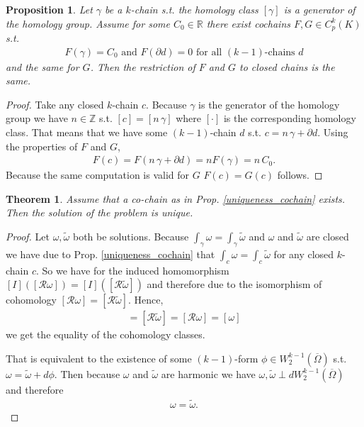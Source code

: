\documentclass[12pt,a4paper]{article}
\newtheorem{proposition}{Proposition}
\newtheorem{theorem}{Theorem}
\newcommand{\omegabar}{\overline{\Omega}}
\newcommand{\real}{\mathbb{R}}
\newcommand{\rop}{\mathscr{R}} %
\begin{document}
\begin{proposition}
    Let $\gamma$ be a $k$-chain s.t. the homology class $[\gamma]$ 
    is a generator of the homology group. Assume for some $C_0 \in \real$ 
    there exist cochains $F,G \in C^k_p(K)$ s.t.
    \begin{align*}
    F(\gamma) = C_0 \text{ and } F(\partial d) = 0 
    \text{ for all } (k-1) \text{-chains } d
    \end{align*}
    and the same for $G$. Then the restriction of $F$ and $G$ to closed 
    chains is the same.
\end{proposition} \label{uniqueness_cochain}
\begin{proof}
    Take any closed $k$-chain $c$. Because $\gamma$ is the generator of the 
    homology group we have $n \in \mathbb{Z}$ s.t. $[c] = [n \, \gamma]$
    where $[\cdot]$ is the corresponding homology class. That means that we have
    some $(k-1)$-chain $d$ s.t. $c = n \, \gamma + \partial d$. Using the 
    properties of $F$ and $G$,
    \begin{align*}
        F(c) = F(n \, \gamma + \partial d) = n F(\gamma) = n \, C_0.
    \end{align*}
    Because the same computation is valid for $G$ $F(c) = G(c)$ follows.
\end{proof}

\begin{theorem}
    Assume that a co-chain as in Prop. \ref{uniqueness_cochain}  exists. 
    Then the solution of the problem is unique.
\end{theorem}
\begin{proof}
    Let $\omega, \tilde{\omega}$ both be solutions. 
    Because $\int_\gamma \omega = \int_\gamma \tilde{\omega}$ and $\omega$ and
    $\tilde{\omega}$ are closed we have due to Prop. \ref{uniqueness_cochain} %
    that $\int_c \omega = \int_c \tilde{\omega}$ for any closed $k$-chain $c$.
    So we have for the induced homomorphism $[I]([\rop \omega]) = 
    [I]([\rop \tilde{\omega}])$ and therefore due to the isomorphism of 
    cohomology $[\rop \omega] = [\rop \tilde{\omega}]$. Hence,
    \begin{align*}
    [\tilde{\omega}] = [\rop \tilde{\omega}] = 
    [\rop \omega] = [\omega]
    \end{align*}
    we get the equality of the cohomology classes. \par
    
    That is equivalent to the
    existence of some $(k-1)$-form $\phi \in W^{k-1}_2(\omegabar)$ s.t.
    $\omega = \tilde{\omega} + d\phi$. Then because $\omega$ and 
    $\tilde{\omega}$ are harmonic we have 
    $\omega, \tilde{\omega} \perp dW^{k-1}_2(\omegabar)$ and therefore 
    \begin{align*}
    \omega = \tilde{\omega}.
    \end{align*}
\end{proof}
\end{document}
